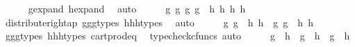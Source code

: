 \begin{isabellebody}
\ \ \ \ \isamarkupfalse%
\ g{\isacharunderscore}{\kern0pt}expand\ h{\isacharunderscore}{\kern0pt}expand\ \isamarkupfalse%
\ auto\isanewline
\ \ \isamarkupfalse%
\ \isamarkupfalse%
\ {\isachardoublequoteopen}{\isasymlangle}{\isasymlangle}g{}{\isacharcomma}{\kern0pt}\ g{}{\isasymrangle}{\isacharcomma}{\kern0pt}\ {\isasymlangle}g{}{\isacharcomma}{\kern0pt}\ g{}{\isasymrangle}{\isasymrangle}\ {\isacharequal}{\kern0pt}\ {\isasymlangle}{\isasymlangle}h{}{\isacharcomma}{\kern0pt}\ h{}{\isasymrangle}{\isacharcomma}{\kern0pt}\ {\isasymlangle}h{}{\isacharcomma}{\kern0pt}\ h{}{\isasymrangle}{\isasymrangle}{\isachardoublequoteclose}\isanewline
\ \ \ \ \isamarkupfalse%
\ distribute{\isacharunderscore}{\kern0pt}right{\isacharunderscore}{\kern0pt}ap\ g{}{\isacharunderscore}{\kern0pt}g{}{\isacharunderscore}{\kern0pt}g{}{\isacharunderscore}{\kern0pt}types\ h{}{\isacharunderscore}{\kern0pt}h{}{\isacharunderscore}{\kern0pt}h{}{\isacharunderscore}{\kern0pt}types\ \isamarkupfalse%
\ auto\isanewline
\ \ \isamarkupfalse%
\ \isamarkupfalse%
\ {\isachardoublequoteopen}{\isasymlangle}g{}{\isacharcomma}{\kern0pt}\ g{}{\isasymrangle}\ {\isacharequal}{\kern0pt}\ {\isasymlangle}h{}{\isacharcomma}{\kern0pt}\ h{}{\isasymrangle}\ {\isasymand}\ {\isasymlangle}g{}{\isacharcomma}{\kern0pt}\ g{}{\isasymrangle}\ {\isacharequal}{\kern0pt}\ {\isasymlangle}h{}{\isacharcomma}{\kern0pt}\ h{}{\isasymrangle}{\isachardoublequoteclose}\isanewline
\ \ \ \ \isamarkupfalse%
\ g{}{\isacharunderscore}{\kern0pt}g{}{\isacharunderscore}{\kern0pt}g{}{\isacharunderscore}{\kern0pt}types\ h{}{\isacharunderscore}{\kern0pt}h{}{\isacharunderscore}{\kern0pt}h{}{\isacharunderscore}{\kern0pt}types\ cart{\isacharunderscore}{\kern0pt}prod{\isacharunderscore}{\kern0pt}eq{}\ \isamarkupfalse%
\ {\isacharparenleft}{\kern0pt}typecheck{\isacharunderscore}{\kern0pt}cfuncs{\isacharcomma}{\kern0pt}\ auto{\isacharparenright}{\kern0pt}\isanewline
\ \ \isamarkupfalse%
\ \isamarkupfalse%
\ {\isachardoublequoteopen}g{}\ {\isacharequal}{\kern0pt}\ h{}\ {\isasymand}\ g{}\ {\isacharequal}{\kern0pt}\ h{}\ {\isasymand}\ g{}\ {\isacharequal}{\kern0pt}\ h{}{\isachardoublequoteclose}\isanewline

\end{isabellebody}
